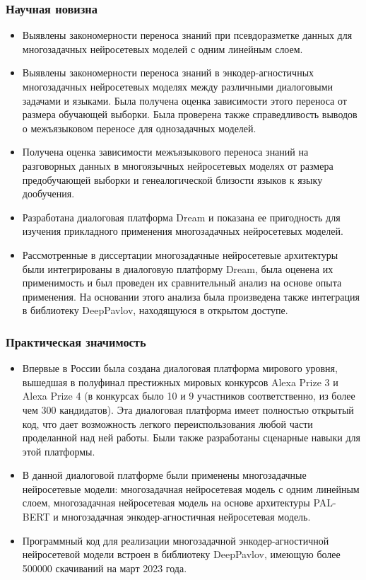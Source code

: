 \begin{frame}
    \frametitle{Научная новизна}
    \begin{itemize}
  \item {Выявлены закономерности переноса знаний при псевдоразметке данных для многозадачных нейросетевых моделей с одним линейным слоем.}
  \item {Выявлены закономерности переноса знаний в энкодер-агностичных многозадачных нейросетевых моделях между различными диалоговыми задачами и языками. Была получена оценка зависимости этого переноса от размера обучающей выборки. Была проверена также справедливость выводов о межъязыковом переносе для однозадачных моделей.}
  \item {Получена оценка зависимости межъязыкового переноса знаний на разговорных данных в многоязычных нейросетевых моделях от размера предобучающей выборки и генеалогической близости языков к языку дообучения.}
  \item {Разработана диалоговая платформа Dream и показана ее пригодность для изучения прикладного применения многозадачных нейросетевых моделей.}
  \item {Рассмотренные в диссертации многозадачные нейросетевые архитектуры были интегрированы в диалоговую платформу Dream, была оценена их применимость и был проведен их сравнительный анализ на основе опыта применения. На основании этого анализа была произведена также интеграция в библиотеку DeepPavlov, находящуюся в открытом доступе.}
    \end{itemize}
\end{frame}
\note{
}

\begin{frame}
    \frametitle{Практическая значимость}
    \begin{itemize}
   \item Впервые в России была создана диалоговая платформа мирового уровня, вышедшая в полуфинал престижных мировых конкурсов Alexa Prize 3 и Alexa Prize 4 (в конкурсах было 10 и 9 участников соответственно, из более чем 300 кандидатов). Эта диалоговая платформа имеет полностью открытый код, что дает возможность легкого переиспользования любой части проделанной над ней работы. Были также разработаны сценарные навыки для этой платформы.
   \item В данной диалоговой платформе были применены многозадачные нейросетевые модели: многозадачная нейросетевая модель с одним линейным слоем, многозадачная нейросетевая модель на основе архитектуры PAL-BERT и многозадачная энкодер-агностичная нейросетевая модель.
   \item Программный код для реализации многозадачной энкодер-агностичной нейросетевой модели встроен в библиотеку DeepPavlov, имеющую более 500000 скачиваний на март 2023 года.
    \end{itemize}
\end{frame}
\note{
}


